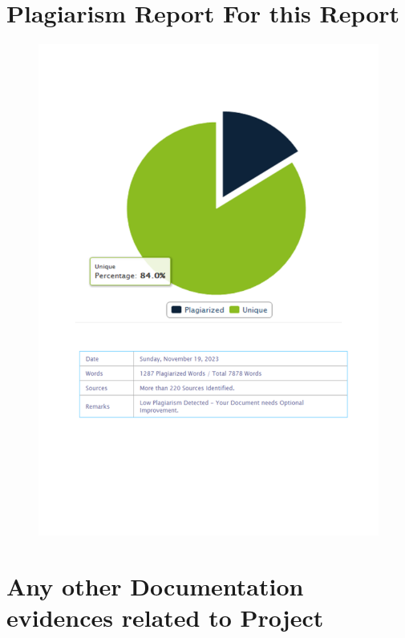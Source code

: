 \documentclass[oneside,a4paper,12pt]{report}
\begin{document}
\begin{appendices}
\chapter{Plagiarism Report For this Report}


\begin{figure}[H]
\begin{center}
\includegraphics[width=1.0\linewidth]{plagfinal}
\end{center}
\end{figure}  

\chapter{Any other Documentation evidences related to Project}
\end{appendices}
\end{document}
